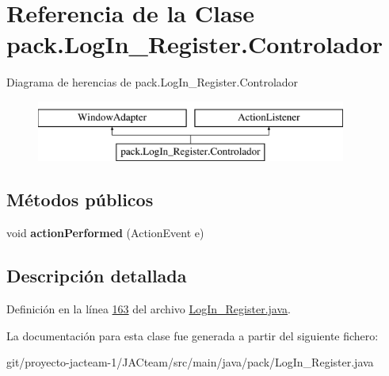 \hypertarget{classpack_1_1_log_in___register_1_1_controlador}{}\section{Referencia de la Clase pack.\+Log\+In\+\_\+\+Register.\+Controlador}
\label{classpack_1_1_log_in___register_1_1_controlador}
Diagrama de herencias de pack.\+Log\+In\+\_\+\+Register.\+Controlador\begin{figure}[H]
\begin{center}
\leavevmode
\includegraphics[height=2.000000cm]{classpack_1_1_log_in___register_1_1_controlador}
\end{center}
\end{figure}
\subsection*{Métodos públicos}
\begin{DoxyCompactItemize}
\item 
\mbox{\label{classpack_1_1_log_in___register_1_1_controlador_acc9a3991c9b10c4e181feb2991a8cf8d}} 
void {\bfseries action\+Performed} (Action\+Event e)
\end{DoxyCompactItemize}


\subsection{Descripción detallada}


Definición en la línea \mbox{\hyperlink{_log_in___register_8java_source_l00163}{163}} del archivo \mbox{\hyperlink{_log_in___register_8java_source}{Log\+In\+\_\+\+Register.\+java}}.



La documentación para esta clase fue generada a partir del siguiente fichero\+:\begin{DoxyCompactItemize}
\item 
git/proyecto-\/jacteam-\/1/\+J\+A\+Cteam/src/main/java/pack/Log\+In\+\_\+\+Register.\+java\end{DoxyCompactItemize}
